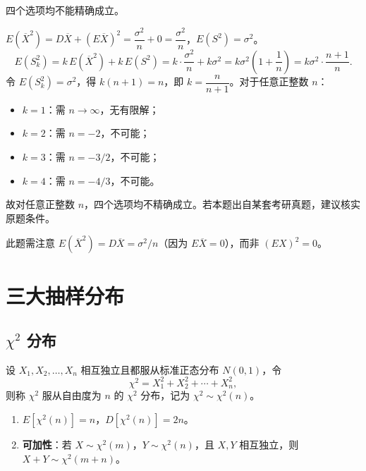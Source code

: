 \documentclass[lang=cn,11pt]{elegantbook}
\begin{document}
\begin{solution}
四个选项均不能精确成立。

\(E(\overline{X}^2) = D\overline{X} + (E\overline{X})^2 = \dfrac{\sigma^2}{n} + 0 = \dfrac{\sigma^2}{n}\)，\(E(S^2) = \sigma^2\)。
\[
E(S_k^2) = k\,E(\overline{X}^2) + k\,E(S^2) = k \cdot \frac{\sigma^2}{n} + k\sigma^2 = k\sigma^2\!\left(1+\frac{1}{n}\right) = k\sigma^2 \cdot \frac{n+1}{n}.
\]
令 \(E(S_k^2) = \sigma^2\)，得 \(k(n+1) = n\)，即 \(k = \dfrac{n}{n+1}\)。对于任意正整数 \(n\)：
\begin{itemize}
    \item \(k=1\)：需 \(n\to\infty\)，无有限解；
    \item \(k=2\)：需 \(n=-2\)，不可能；
    \item \(k=3\)：需 \(n=-3/2\)，不可能；
    \item \(k=4\)：需 \(n=-4/3\)，不可能。
\end{itemize}
故对任意正整数 \(n\)，四个选项均不精确成立。若本题出自某套考研真题，建议核实原题条件。
\begin{note}
此题需注意 \(E(\overline{X}^2) = D\overline{X} = \sigma^2/n\)（因为 \(E\overline{X}=0\)），而非 \((EX)^2=0\)。
\end{note}
\end{solution}


\section{三大抽样分布}

\subsection{\texorpdfstring{\(\chi^2\)}{χ²} 分布}

\begin{definition} \label{def:chi2}
设 \(X_1, X_2, \dots, X_n\) 相互独立且都服从标准正态分布 \(N(0,1)\)，令
\[
\chi^2 = X_1^2 + X_2^2 + \cdots + X_n^2,
\]
则称 \(\chi^2\) 服从自由度为 \(n\) 的 \(\chi^2\) 分布，记为 \(\chi^2 \sim \chi^2(n)\)。
\end{definition}

\begin{property}\label{prop:chi2-property} 
\begin{enumerate}
    \item \(E[\chi^2(n)] = n\)，\(D[\chi^2(n)] = 2n\)。
    \item \textbf{可加性}：若 \(X \sim \chi^2(m)\)，\(Y \sim \chi^2(n)\)，且 \(X, Y\) 相互独立，则 \(X + Y \sim \chi^2(m+n)\)。
\end{enumerate}
\end{property}
\end{document}
